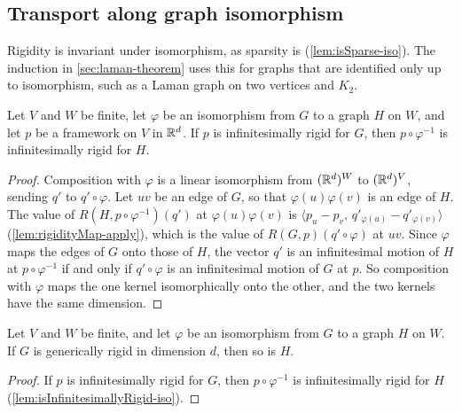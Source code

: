 \subsection{Transport along graph isomorphism}
\label{sec:rigidity-iso-transport}

Rigidity is invariant under isomorphism, as sparsity is
(\cref{lem:isSparse-iso}). The induction in \cref{sec:laman-theorem}
uses this for graphs that are identified only up to isomorphism, such
as a Laman graph on two vertices and $K_2$.

\begin{lemma}
  \label{lem:isInfinitesimallyRigid-iso}
  \leanok
  Let $V$ and $W$ be finite, let $\varphi$ be an isomorphism from $G$
  to a graph $H$ on $W$, and let $p$ be a framework on $V$ in ${\mathbb{R}}^{d}$.
  If $p$ is infinitesimally rigid for $G$, then $p \circ \varphi^{-1}$
  is infinitesimally rigid for $H$.
\end{lemma}
\begin{proof}
  \leanok
  Composition with $\varphi$ is a linear isomorphism from
  $({\mathbb{R}}^{d})^{W}$ to $({\mathbb{R}}^{d})^{V}$, sending $q'$ to $q' \circ \varphi$.
  Let $uv$ be an edge of $G$, so that $\varphi(u)\varphi(v)$ is an edge
  of $H$. The value of $R(H, p \circ \varphi^{-1})(q')$ at
  $\varphi(u)\varphi(v)$ is
  $\langle p_u - p_v,\, q'_{\varphi(u)} - q'_{\varphi(v)} \rangle$
  (\cref{lem:rigidityMap-apply}), which is the value of
  $R(G, p)(q' \circ \varphi)$ at $uv$. Since $\varphi$ maps the edges
  of $G$ onto those of $H$, the vector $q'$ is an infinitesimal motion
  of $H$ at $p \circ \varphi^{-1}$ if and only if
  $q' \circ \varphi$ is an infinitesimal motion of $G$ at $p$. So
  composition with $\varphi$ maps the one kernel isomorphically onto
  the other, and the two kernels have the same dimension.
\end{proof}

\begin{lemma}
  \label{lem:isGenericallyRigid-iso}
  \leanok
  Let $V$ and $W$ be finite, and let $\varphi$ be an isomorphism from
  $G$ to a graph $H$ on $W$. If $G$ is generically rigid in dimension
  $d$, then so is $H$.
\end{lemma}
\begin{proof}
  \leanok
  If $p$ is infinitesimally rigid for $G$, then $p \circ \varphi^{-1}$
  is infinitesimally rigid for $H$ (\cref{lem:isInfinitesimallyRigid-iso}).
\end{proof}

